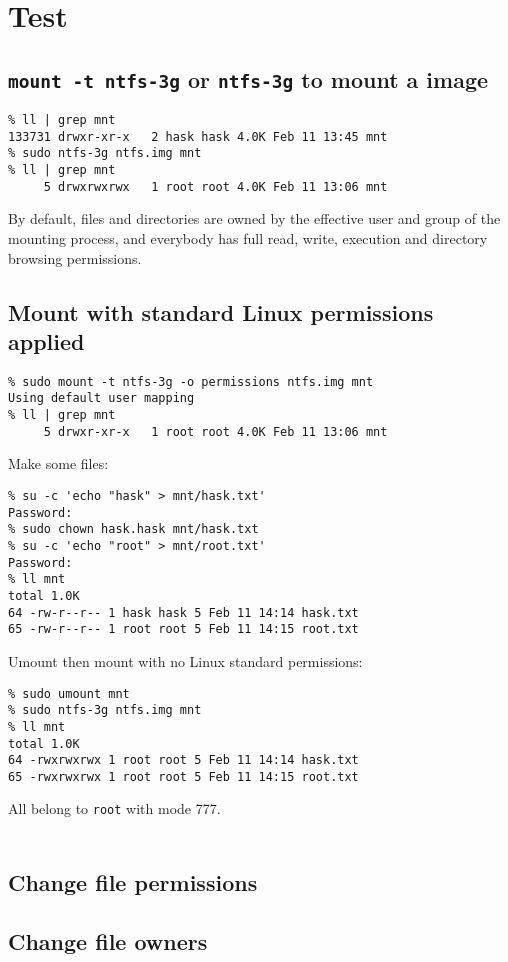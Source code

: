\documentclass[a4paper]{report}
\begin{document}
\section{Test}
\subsection{{\tt mount -t ntfs-3g} or {\tt ntfs-3g} to mount a image}
\begin{lstlisting}
% ll | grep mnt
133731 drwxr-xr-x   2 hask hask 4.0K Feb 11 13:45 mnt
% sudo ntfs-3g ntfs.img mnt
% ll | grep mnt           
     5 drwxrwxrwx   1 root root 4.0K Feb 11 13:06 mnt
\end{lstlisting}
By default, files and directories are owned by the effective user and group of the 
mounting process, and everybody has full read, write, execution and directory 
browsing permissions.\\
\subsection{Mount with standard Linux permissions applied}
\begin{lstlisting}
% sudo mount -t ntfs-3g -o permissions ntfs.img mnt
Using default user mapping
% ll | grep mnt                                   
     5 drwxr-xr-x   1 root root 4.0K Feb 11 13:06 mnt
\end{lstlisting}
Make some files:
\begin{lstlisting}
% su -c 'echo "hask" > mnt/hask.txt'                 
Password: 
% sudo chown hask.hask mnt/hask.txt                
% su -c 'echo "root" > mnt/root.txt'             
Password: 
% ll mnt                  
total 1.0K
64 -rw-r--r-- 1 hask hask 5 Feb 11 14:14 hask.txt
65 -rw-r--r-- 1 root root 5 Feb 11 14:15 root.txt
\end{lstlisting}
Umount then mount with no Linux standard permissions:
\begin{lstlisting}
% sudo umount mnt
% sudo ntfs-3g ntfs.img mnt
% ll mnt                  
total 1.0K
64 -rwxrwxrwx 1 root root 5 Feb 11 14:14 hask.txt
65 -rwxrwxrwx 1 root root 5 Feb 11 14:15 root.txt
\end{lstlisting}
All belong to {\tt root} with mode 777.\\\\
\subsection{Change file permissions}
\subsection{Change file owners}
\end{document}
